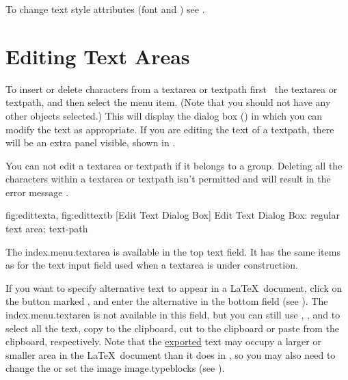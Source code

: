 To change text style attributes (font and ) see
.

\section{Editing Text Areas}\label{sec:edittext}


To insert or delete characters from a \gls{textarea} or \gls{textpath} first
\select\ the \gls*{textarea} or \gls*{textpath}, and then
select the  menu item.  (Note
that you should not have any other \glspl{object} selected.) This
will display the  dialog box
() in which you can modify the text as
appropriate. If you are editing the text of a \gls{textpath}, there
will be an extra panel visible, shown in
.

\begin{information}
You can not edit a \gls*{textarea} or \gls*{textpath} if
it belongs to a \gls{group}. Deleting all the characters within a
\gls*{textarea} or \gls*{textpath} isn't permitted and will result
in the error message .
\end{information}

{
  {fig:edittexta}{}{},
  {fig:edittextb}{}{}
}
[Edit Text Dialog Box]
{Edit Text Dialog Box:  regular text area;
 text-path}

The \gls{index.menu.textarea} is available in the top text field.
It has the same items as for the text input field used when a \gls{textarea}
is under construction.

If you want to specify alternative text to appear in a \LaTeX\
document, click on the button marked ,
and enter the alternative in the bottom field (see
). The \gls{index.menu.textarea} is not
available in this field, but you can still use
,
, 
and \accelerator{menu.textarea.paste} to select all the text, copy
to the clipboard, cut to the clipboard or paste from the clipboard,
respectively. Note that the \hyperref[sec:exportpgf]{exported} text
may occupy a larger or smaller area in the \LaTeX\ document than it
does in \FlowframTk, so you may also need to change the
 or set the image \glspl{image.typeblock}
(see ).

